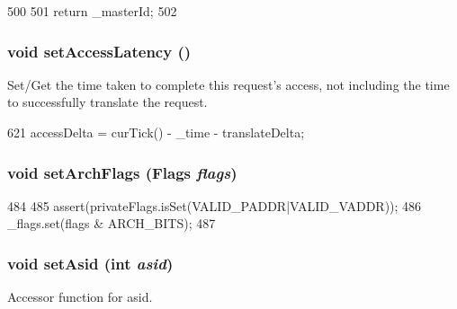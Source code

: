\begin{DoxyCode}
500     {
501         return _masterId;
502     }
\end{DoxyCode}
\hypertarget{classRequest_ae10871c545a9288b0b1cf05f43d49e19}{
\subsubsection[{setAccessLatency}]{\setlength{\rightskip}{0pt plus 5cm}void setAccessLatency ()}}
\label{classRequest_ae10871c545a9288b0b1cf05f43d49e19}
Set/Get the time taken to complete this request's access, not including the time to successfully translate the request. 


\begin{DoxyCode}
621 { accessDelta = curTick() - _time - translateDelta; }
\end{DoxyCode}
\hypertarget{classRequest_ae865b4f9ef7305fb13ed6e3be9e82b49}{
\subsubsection[{setArchFlags}]{\setlength{\rightskip}{0pt plus 5cm}void setArchFlags ({\bf Flags} {\em flags})}}
\label{classRequest_ae865b4f9ef7305fb13ed6e3be9e82b49}



\begin{DoxyCode}
484     {
485         assert(privateFlags.isSet(VALID_PADDR|VALID_VADDR));
486         _flags.set(flags & ARCH_BITS);
487     }
\end{DoxyCode}
\hypertarget{classRequest_aef60755a55f22e515c1772adcc208919}{
\subsubsection[{setAsid}]{\setlength{\rightskip}{0pt plus 5cm}void setAsid (int {\em asid})}}
\label{classRequest_aef60755a55f22e515c1772adcc208919}
Accessor function for asid. 


